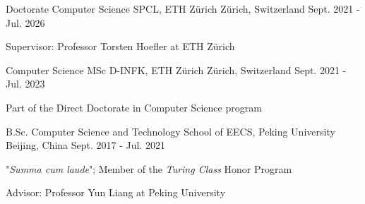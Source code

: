 

\begin{cventries}

  \cventry
    {Doctorate Computer Science} %
    {SPCL, ETH Zürich} %
    {Zürich, Switzerland} %
    {Sept. 2021 - Jul. 2026} %
    {
      \begin{cvitems} %
      \item {Supervisor: Professor Torsten Hoefler at ETH Zürich}
      \end{cvitems}
    }

  \cventry
    {Computer Science MSc} %
    {D-INFK, ETH Zürich} %
    {Zürich, Switzerland} %
    {Sept. 2021 - Jul. 2023} %
    {
      \begin{cvitems} %
      \item {Part of the Direct Doctorate in Computer Science program}
      \end{cvitems}
    }

  \cventry
    {B.Sc. Computer Science and Technology} %
    {School of EECS, Peking University} %
    {Beijing, China} %
    {Sept. 2017 - Jul. 2021} %
    {
      \begin{cvitems} %
      \item {"\emph{Summa cum laude}"; Member of the \emph{Turing Class} Honor Program}
      \item {Advisor: Professor Yun Liang at Peking University}
      \end{cvitems}
    }

\end{cventries}
